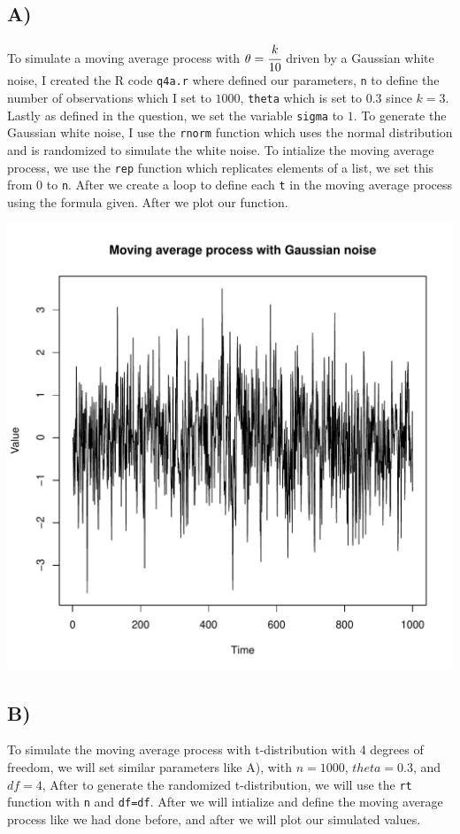 \documentclass[11pt, letterpaper]{article}
\begin{document}
\subsection*{A)}
To simulate a moving average process with $\theta = \cfrac{k}{10}$ driven by a
Gaussian
white noise, I created the R code \verb|q4a.r| where defined our parameters,
\verb|n| to define the number
of observations which I set to $1000$, \verb|theta| which is set to $0.3$ since
$k=3$. Lastly as defined
in the question, we set the variable \verb|sigma| to $1$. To generate the
Gaussian white noise, I use the
\verb|rnorm| function which uses the normal distribution and is randomized to
simulate the white noise. To intialize
the moving average process, we use the \verb|rep| function which replicates
elements of a list, we set this from $0$ to \verb|n|.
After we create a loop to define each \verb|t| in the moving average process
using the formula given. After
we plot our function.

\begin{file}[q4a.r]
	
\end{file}
\begin{center}
	\includegraphics[scale=0.47]{code/q4a}
\end{center}

\subsection*{B)}
To simulate the moving average process with t-distribution with 4 degrees of
freedom, we will set similar
parameters like A), with $n=1000$, $theta = 0.3$, and $df=4$, After to generate
the randomized t-distribution,
we will use the \verb|rt| function with \verb|n| and \verb|df=df|. After we
will intialize and define the moving
average process like we had done before, and after we will plot our simulated
values.
\end{document}
